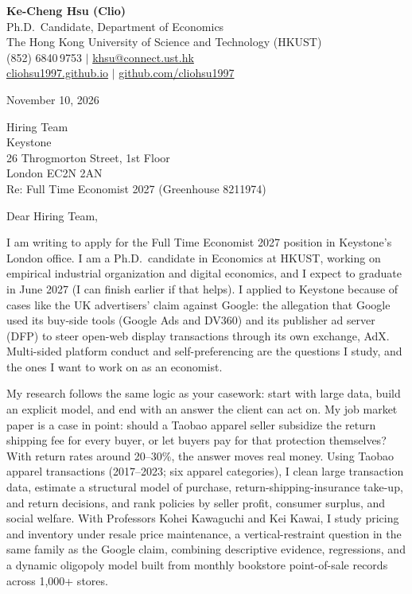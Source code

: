 \documentclass[11pt,letterpaper]{article}
\begin{document}
\noindent
{\bfseries Ke-Cheng Hsu (Clio)}\\
Ph.D.\ Candidate, Department of Economics\\
The Hong Kong University of Science and Technology (HKUST)\\
(852) 6840\,9753 \quad $|$ \quad \href{mailto:khsu@connect.ust.hk}{khsu@connect.ust.hk}\\
\href{https://cliohsu1997.github.io/}{cliohsu1997.github.io} \quad $|$ \quad \href{https://github.com/cliohsu1997}{github.com/cliohsu1997}

\vspace{0.7em}
\noindent
November 10, 2026

\vspace{0.35em}
\noindent
Hiring Team\\
Keystone\\
26 Throgmorton Street, 1st Floor\\
London EC2N 2AN\\
Re: Full Time Economist 2027 (Greenhouse 8211974)

\vspace{0.2em}
Dear Hiring Team,

I am writing to apply for the Full Time Economist 2027 position in Keystone's London office. I am a Ph.D.\ candidate in Economics at HKUST, working on empirical industrial organization and digital economics, and I expect to graduate in June 2027 (I can finish earlier if that helps). I applied to Keystone because of cases like the UK advertisers' claim against Google: the allegation that Google used its buy-side tools (Google Ads and DV360) and its publisher ad server (DFP) to steer open-web display transactions through its own exchange, AdX. Multi-sided platform conduct and self-preferencing are the questions I study, and the ones I want to work on as an economist.

My research follows the same logic as your casework: start with large data, build an explicit model, and end with an answer the client can act on. My job market paper is a case in point: should a Taobao apparel seller subsidize the return shipping fee for every buyer, or let buyers pay for that protection themselves? With return rates around 20--30\%, the answer moves real money. Using Taobao apparel transactions (2017--2023; six apparel categories), I clean large transaction data, estimate a structural model of purchase, return-shipping-insurance take-up, and return decisions, and rank policies by seller profit, consumer surplus, and social welfare. With Professors Kohei Kawaguchi and Kei Kawai, I study pricing and inventory under resale price maintenance, a vertical-restraint question in the same family as the Google claim, combining descriptive evidence, regressions, and a dynamic oligopoly model built from monthly bookstore point-of-sale records across 1{,}000+ stores.
\end{document}
